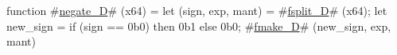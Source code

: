 function #\hyperref[sailRISCVznegatezyD]{negate\_D}# (x64) = {
  let (sign, exp, mant) = #\hyperref[sailRISCVzfsplitzyD]{fsplit\_D}# (x64);
  let new_sign = if (sign == 0b0) then 0b1 else 0b0;
  #\hyperref[sailRISCVzfmakezyD]{fmake\_D}# (new_sign, exp, mant)
}
